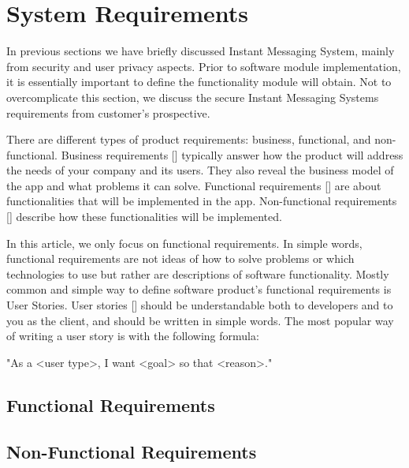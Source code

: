 \chapter{System Requirements}\label{ch:system-requirements}

In previous sections we have briefly discussed Instant Messaging System, mainly from security and user privacy aspects.
Prior to software module implementation, it is essentially important to define the functionality module will obtain.
Not to overcomplicate this section, we discuss the secure Instant Messaging Systems requirements from customer's prospective.

There are different types of product requirements: business, functional, and non-functional.
Business requirements [\cite{dilworth2007creation}] typically answer how the product will address the needs of your company and its users.
They also reveal the business model of the app and what problems it can solve.
Functional requirements [\cite{malan2001functional}] are about functionalities that will be implemented in the app.
Non-functional requirements [\cite{chung2012non}] describe how these functionalities will be implemented.

In this article, we only focus on functional requirements.
In simple words, functional requirements are not ideas of how to solve problems or which technologies to use but rather
are descriptions of software functionality.
Mostly common and simple way to define software product's functional requirements is User Stories.
User stories [\cite{cohn2004user}] should be understandable both to developers and to you as the client, and should be written in simple words.
The most popular way of writing a user story is with the following formula:

\begin{center}
    \begin{spverbatim}
        "As a <user type>, I want <goal> so that <reason>."
    \end{spverbatim}
\end{center}


\section{Functional Requirements}\label{sec:functional-requirements}



\section{Non-Functional Requirements}\label{sec:non-functional-requirements}
